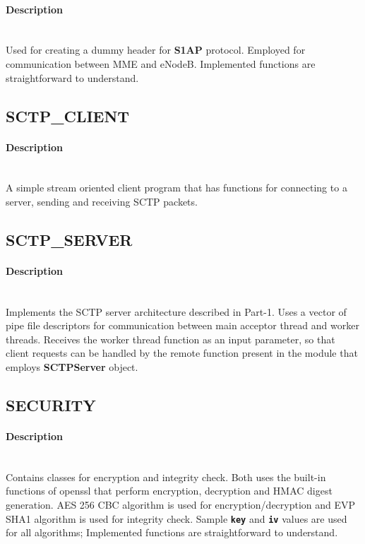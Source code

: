 \documentclass[hidelinks]{report}
\newcommand{\cf}[1] {
	\textbf{\texttt{#1}}
}
\begin{document}
\paragraph*{Description}

~\\ Used for creating a dummy header for \textbf{S1AP} protocol. Employed for communication between MME and eNodeB. Implemented functions are straightforward to understand.

\subsection*{SCTP\_CLIENT}

\paragraph*{Description}

~\\ A simple stream oriented client program that has functions for connecting to a server, sending and receiving SCTP packets. 

\subsection*{SCTP\_SERVER}

\paragraph*{Description}

~\\ Implements the SCTP server architecture described in Part-1. Uses a vector of pipe file descriptors for communication between main acceptor thread and worker threads. Receives the worker thread function as an input parameter, so that client requests can be handled by the remote function present in the module that employs \textbf{SCTPServer} object.

\subsection*{SECURITY}

\paragraph*{Description}

~\\ Contains classes for encryption and integrity check. Both uses the built-in functions of openssl that perform encryption, decryption and HMAC digest generation. AES 256 CBC algorithm is used for encryption/decryption and EVP SHA1 algorithm is used for integrity check. Sample \cf{key} and \cf{iv} values are used for all algorithms; Implemented functions are straightforward to understand.
\end{document}

